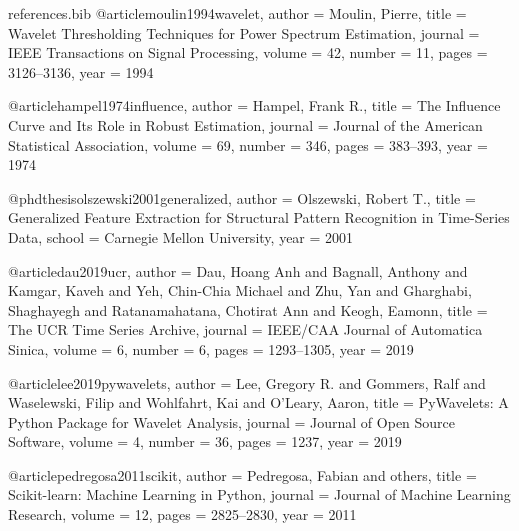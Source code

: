 \begin{filecontents*}[overwrite]{references.bib}
@article{moulin1994wavelet,
  author  = {Moulin, Pierre},
  title   = {Wavelet Thresholding Techniques for Power Spectrum Estimation},
  journal = {IEEE Transactions on Signal Processing},
  volume  = {42},
  number  = {11},
  pages   = {3126--3136},
  year    = {1994}
}

@article{hampel1974influence,
  author  = {Hampel, Frank R.},
  title   = {The Influence Curve and Its Role in Robust Estimation},
  journal = {Journal of the American Statistical Association},
  volume  = {69},
  number  = {346},
  pages   = {383--393},
  year    = {1974}
}

@phdthesis{olszewski2001generalized,
  author = {Olszewski, Robert T.},
  title  = {Generalized Feature Extraction for Structural Pattern Recognition in Time-Series Data},
  school = {Carnegie Mellon University},
  year   = {2001}
}

@article{dau2019ucr,
  author  = {Dau, Hoang Anh and Bagnall, Anthony and Kamgar, Kaveh and Yeh, Chin-Chia Michael and Zhu, Yan and Gharghabi, Shaghayegh and Ratanamahatana, Chotirat Ann and Keogh, Eamonn},
  title   = {The {UCR} Time Series Archive},
  journal = {IEEE/CAA Journal of Automatica Sinica},
  volume  = {6},
  number  = {6},
  pages   = {1293--1305},
  year    = {2019}
}

@article{lee2019pywavelets,
  author  = {Lee, Gregory R. and Gommers, Ralf and Waselewski, Filip and Wohlfahrt, Kai and O'Leary, Aaron},
  title   = {{PyWavelets}: A {P}ython Package for Wavelet Analysis},
  journal = {Journal of Open Source Software},
  volume  = {4},
  number  = {36},
  pages   = {1237},
  year    = {2019}
}

@article{pedregosa2011scikit,
  author  = {Pedregosa, Fabian and others},
  title   = {Scikit-learn: Machine Learning in {P}ython},
  journal = {Journal of Machine Learning Research},
  volume  = {12},
  pages   = {2825--2830},
  year    = {2011}
}
\end{filecontents*}

\documentclass[11pt,a4paper,twoside,openright]{report}

\usepackage{iftex}
\ifPDFTeX
  \usepackage[T1]{fontenc}
  \usepackage[utf8]{inputenc}
  \usepackage{lmodern}
\else
  \usepackage{fontspec}
\fi
\usepackage[english,french]{babel}
\usepackage{microtype}

\usepackage[a4paper,margin=2.6cm,bindingoffset=0.6cm]{geometry}
\usepackage{setspace}
\usepackage{fancyhdr}
\pagestyle{fancy}
\fancyhf{}
\fancyhead[LE,RO]{\thepage}
\fancyhead[RE]{\small\nouppercase{\leftmark}}
\fancyhead[LO]{\small\nouppercase{\rightmark}}
\renewcommand{\headrulewidth}{0.3pt}
\setlength{\headheight}{14pt}
\fancypagestyle{plain}{\fancyhf{}\fancyfoot[C]{\thepage}\renewcommand{\headrulewidth}{0pt}}


